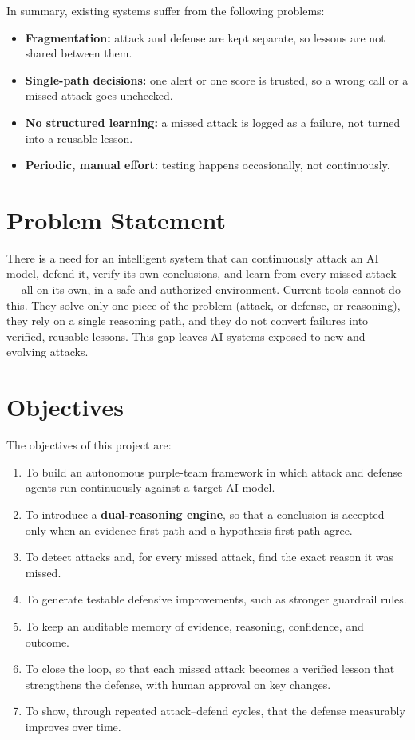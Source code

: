 In summary, existing systems suffer from the following problems:

\begin{itemize}
  \item \textbf{Fragmentation:} attack and defense are kept separate, so lessons
  are not shared between them.
  \item \textbf{Single-path decisions:} one alert or one score is trusted, so a
  wrong call or a missed attack goes unchecked.
  \item \textbf{No structured learning:} a missed attack is logged as a failure,
  not turned into a reusable lesson.
  \item \textbf{Periodic, manual effort:} testing happens occasionally, not
  continuously.
\end{itemize}

\section{Problem Statement}

There is a need for an intelligent system that can continuously attack an AI
model, defend it, verify its own conclusions, and learn from every missed attack
--- all on its own, in a safe and authorized environment. Current tools cannot do
this. They solve only one piece of the problem (attack, or defense, or
reasoning), they rely on a single reasoning path, and they do not convert
failures into verified, reusable lessons. This gap leaves AI systems exposed to
new and evolving attacks.

\section{Objectives}

The objectives of this project are:

\begin{enumerate}
  \item To build an autonomous purple-team framework in which attack and defense
  agents run continuously against a target AI model.
  \item To introduce a \textbf{dual-reasoning engine}, so that a conclusion is
  accepted only when an evidence-first path and a hypothesis-first path agree.
  \item To detect attacks and, for every missed attack, find the exact reason it
  was missed.
  \item To generate testable defensive improvements, such as stronger guardrail
  rules.
  \item To keep an auditable memory of evidence, reasoning, confidence, and
  outcome.
  \item To close the loop, so that each missed attack becomes a verified lesson
  that strengthens the defense, with human approval on key changes.
  \item To show, through repeated attack--defend cycles, that the defense
  measurably improves over time.
\end{enumerate}


